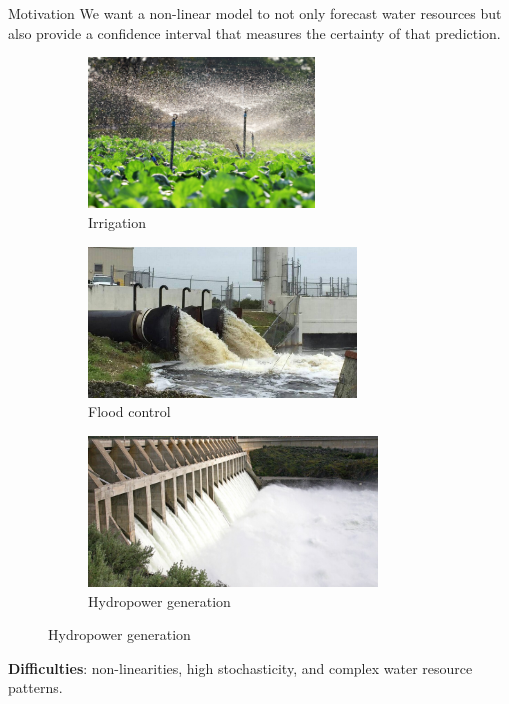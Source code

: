 \documentclass[10pt, xcolor=table]{beamer}
\begin{document}
\begin{frame}{Motivation}
We want a non-linear model to not only forecast water resources but also provide a confidence interval that measures the certainty of that prediction.
\begin{figure}
     \centering
     \begin{subfigure}[b]{0.3\textwidth}
         \centering
         \includegraphics[width=\textwidth, height=4cm]{images/irrigation.jpg}
         \caption{Irrigation}
         \label{fig:y equals x}
     \end{subfigure}
     \hfill
     \begin{subfigure}[b]{0.3\textwidth}
         \centering
         \includegraphics[width=\textwidth, height=4cm]{images/flood_control.jpeg}
         \caption{Flood control}
         \label{fig:three sin x}
     \end{subfigure}
     \hfill
     \begin{subfigure}[b]{0.3\textwidth}
         \centering
         \includegraphics[width=\textwidth, height=4cm]{images/hydro_gen.jpeg}
         \caption{Hydropower generation}
         \label{fig:five over x}
     \end{subfigure}
\end{figure}

\textbf{Difficulties}: non-linearities, high stochasticity, and complex water resource patterns.

\end{frame}
\end{document}

